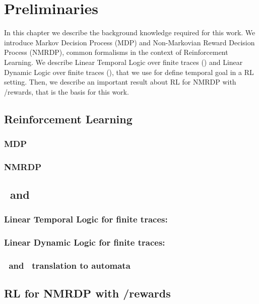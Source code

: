 \chapter{Preliminaries}
In this chapter we describe the background knowledge required for this work. We introduce Markov Decision Process (MDP) and Non-Markovian Reward Decision Process (NMRDP), common formalisms in the context of Reinforcement Learning. We describe Linear Temporal Logic over finite traces (\LTLf) and Linear Dynamic Logic over finite traces (\LDLf), that we use for define temporal goal in a RL setting. Then, we describe an important result about RL for NMRDP with \LTLf/\LDLf rewards, that is the basis for this work.

\section{Reinforcement Learning}
\subsection{MDP}
\subsection{NMRDP}
\section{\LTLf\ and \LDLf\ }
\subsection{Linear Temporal Logic for finite traces: \LTLf}
\subsection{Linear Dynamic Logic for finite traces: \LDLf}
\subsection{\LTLf\ and \LDLf\ translation to automata}
\section{RL for NMRDP with \LTLf/\LDLf rewards}
